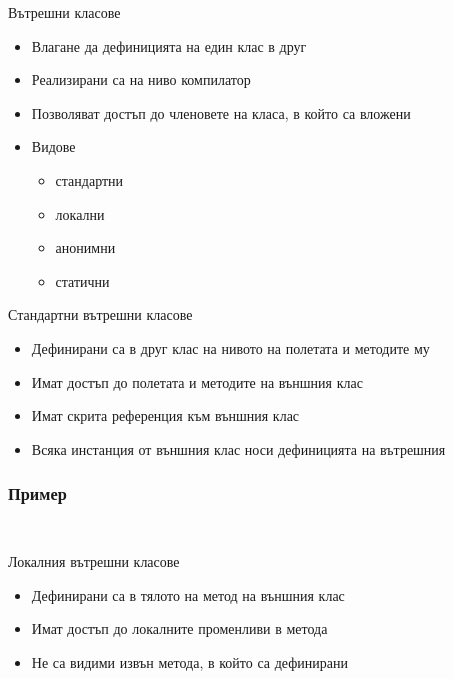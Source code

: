 \documentclass{beamer}
\begin{document}
\begin{frame}{Вътрешни класове}
  \transdissolve
  \begin{itemize}
  \item Влагане да дефиницията на един клас в друг
  \item Реализирани са на ниво компилатор
  \item Позволяват достъп до членовете на класа, в който са вложени
  \item Видове
    \begin{itemize}
      \item стандартни
      \item локални 
      \item анонимни
      \item статични
    \end{itemize}

  \end{itemize}
\end{frame}

\begin{frame}{Стандартни вътрешни класове}
  \transdissolve
  \begin{itemize}
  \item Дефинирани са в друг клас на нивото на полетата и методите му
  \item Имат достъп до полетата и методите на външния клас
  \item Имат скрита референция към външния клас
  \item Всяка инстанция от външния клас носи дефиницията на вътрешния
  \end{itemize}
\end{frame}

\begin{frame}[fragile]
  \frametitle{Пример}
  \transdissolve
\begin{lstlisting}
  
\end{lstlisting}
\end{frame}

\begin{frame}{Локалния вътрешни класове}
  \transdissolve
  \begin{itemize}
  \item Дефинирани са в тялото на метод на външния клас
  \item Имат достъп до локалните променливи в метода
  \item Не са видими извън метода, в който са дефинирани
  \end{itemize}
\end{frame}
\end{document}
